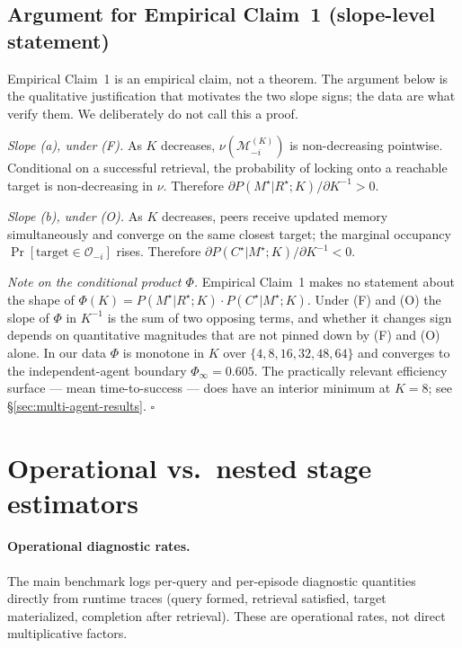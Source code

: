 \documentclass{article}
\begin{document}
\subsection{Argument for Empirical Claim~1 (slope-level statement)}

Empirical Claim~1 is an empirical claim, not a theorem. The argument below is the qualitative justification that motivates the two slope signs; the data are what verify them. We deliberately do not call this a proof.

\emph{Slope (a), under (F).} As $K$ decreases, $\nu(\mathcal{M}_{-i}^{(K)})$ is non-decreasing pointwise. Conditional on a successful retrieval, the probability of locking onto a reachable target is non-decreasing in $\nu$. Therefore $\partial P(M^\star|R^\star;K) / \partial K^{-1} > 0$.

\emph{Slope (b), under (O).} As $K$ decreases, peers receive updated memory simultaneously and converge on the same closest target; the marginal occupancy $\Pr[\text{target}\in\mathcal{O}_{-i}]$ rises. Therefore $\partial P(C^\star|M^\star;K) / \partial K^{-1} < 0$.

\emph{Note on the conditional product $\Phi$.} Empirical Claim~1 makes no statement about the shape of $\Phi(K) = P(M^\star|R^\star;K)\!\cdot\!P(C^\star|M^\star;K)$. Under (F) and (O) the slope of $\Phi$ in $K^{-1}$ is the sum of two opposing terms, and whether it changes sign depends on quantitative magnitudes that are not pinned down by (F) and (O) alone. In our data $\Phi$ is monotone in $K$ over $\{4,8,16,32,48,64\}$ and converges to the independent-agent boundary $\Phi_\infty = 0.605$. The practically relevant efficiency surface --- mean time-to-success --- does have an interior minimum at $K=8$; see \S\ref{sec:multi-agent-results}. \hfill$\square$

\section{Operational vs.\ nested stage estimators}
\label{app:estimators}

\paragraph{Operational diagnostic rates.}
The main benchmark logs per-query and per-episode diagnostic quantities directly from runtime traces (query formed, retrieval satisfied, target materialized, completion after retrieval). These are operational rates, not direct multiplicative factors.
\end{document}
